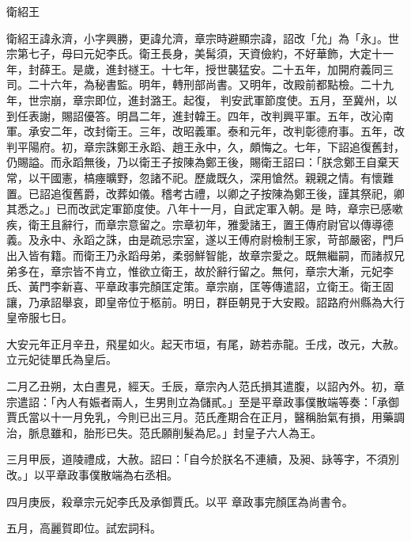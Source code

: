 
\begin{pinyinscope}

 衛紹王



 衛紹王諱永濟，小字興勝，更諱允濟，章宗時避顯宗諱，詔改「允」為「永」。世宗第七子，母曰元妃李氏。衛王長身，美髯須，天資儉約，不好華飾，大定十一年，封薛王。是歲，進封禭王。十七年，授世襲猛安。二十五年，加開府義同三司。二十六年，為秘書監。明年，轉刑部尚書。又明年，改殿前都點檢。二十九年，世宗崩，章宗即位，進封潞王。起復，
 判安武軍節度使。五月，至冀州，以到任表謝，賜詔優答。明昌二年，進封韓王。四年，改判興平軍。五年，改沁南軍。承安二年，改封衛王。三年，改昭義軍。泰和元年，改判彰德府事。五年，改判平陽府。初，章宗誅鄭王永蹈、趙王永中，久，頗悔之。七年，下詔追復舊封，仍賜謚。而永蹈無後，乃以衛王子按陳為鄭王後，賜衛王詔曰：「朕念鄭王自棄天常，以干國憲，槁瘞曠野，忽諸不祀。歷歲既久，深用愴然。親親之情。有懷難置。已詔追復舊爵，改葬如儀。稽考古禮，以卿之子按陳為鄭王後，謹其祭祀，卿其悉之。」已而改武定軍節度使。八年十一月，自武定軍入朝。是
 時，章宗已感嗽疾，衛王且辭行，而章宗意留之。宗章初年，雅愛諸王，置王傳府尉官以傳導德義。及永中、永蹈之誅，由是疏忌宗室，遂以王傅府尉檢制王家，苛部嚴密，門戶出入皆有籍。而衛王乃永蹈母弟，柔弱鮮智能，故章宗愛之。既無繼嗣，而諸叔兄弟多在，章宗皆不肯立，惟欲立衛王，故於辭行留之。無何，章宗大漸，元妃李氏、黃門李新喜、平章政事完顏匡定策。章宗崩，匡等傳遣詔，立衛王。衛王固讓，乃承詔舉哀，即皇帝位于柩前。明日，群臣朝見于大安殿。詔路府州縣為大行皇帝服七日。



 大安元年正月辛丑，飛星如火。起天市垣，有尾，跡若赤龍。壬戌，改元，大赦。立元妃徒單氏為皇后。



 二月乙丑朔，太白晝見，經天。壬辰，章宗內人范氏損其遣腹，以詔內外。初，章宗遣詔：「內人有娠者兩人，生男則立為儲貳。」至是平章政事僕散端等奏：「承御賈氏當以十一月免乳，今則已出三月。范氏產期合在正月，醫稱胎氣有損，用藥調治，脈息雖和，胎形已失。范氏願削髮為尼。」封皇子六人為王。



 三月甲辰，道陵禮成，大赦。詔曰：「自今於朕名不連續，及昶、詠等字，不須別改。」以平章政事僕散端為右丞相。



 四月庚辰，殺章宗元妃李氏及承御賈氏。以平
 章政事完顏匡為尚書令。



 五月，高麗賀即位。試宏詞科。




\end{pinyinscope}
